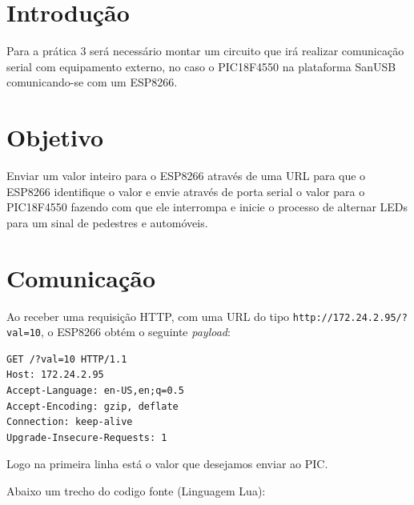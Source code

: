 \section{Introdução}\label{introduuxe7uxe3o}

Para a prática 3 será necessário montar um circuito que irá realizar
comunicação serial com equipamento externo, no caso o PIC18F4550 na
plataforma SanUSB comunicando-se com um ESP8266.

\section{Objetivo}\label{objetivo}

Enviar um valor inteiro para o ESP8266 através de uma URL para que o
ESP8266 identifique o valor e envie através de porta serial o valor para
o PIC18F4550 fazendo com que ele interrompa e inicie o processo de
alternar LEDs para um sinal de pedestres e automóveis.

\section{Comunicação}\label{comunicauxe7uxe3o}

Ao receber uma requisição HTTP, com uma URL do tipo
\texttt{http://172.24.2.95/?val=10}, o ESP8266 obtém o seguinte
\emph{payload}:

\begin{verbatim}
GET /?val=10 HTTP/1.1
Host: 172.24.2.95
Accept-Language: en-US,en;q=0.5
Accept-Encoding: gzip, deflate
Connection: keep-alive
Upgrade-Insecure-Requests: 1
\end{verbatim}

Logo na primeira linha está o valor que desejamos enviar ao PIC.

Abaixo um trecho do codigo fonte (Linguagem Lua):

